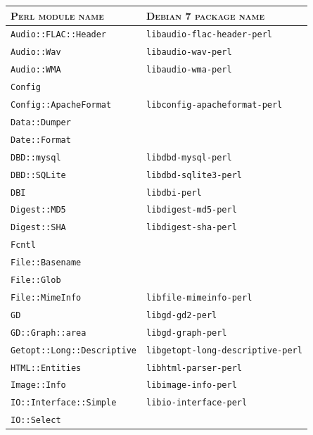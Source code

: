 \documentclass[a4paper,oneside,10pt]{report}
\begin{document}
\begin{table}
	\centering
	\begin{tabular}{|p{15em}|p{18em}|}
		\hline
		\textsc{Perl module name} 						& \textsc{Debian 7 package name} \\
		\hline
		\hline
		\verb|Audio::FLAC::Header| 						& \verb|libaudio-flac-header-perl| \\
		\hline
		\verb|Audio::Wav| 										& \verb|libaudio-wav-perl| \\
		\hline
		\verb|Audio::WMA| 										& \verb|libaudio-wma-perl| \\
		\hline
		\verb|Config| 												& \\
		\hline
		\verb|Config::ApacheFormat|						& \verb|libconfig-apacheformat-perl| \\
		\hline
		\verb|Data::Dumper| 									& \\
		\hline
		\verb|Date::Format| 									& \\
		\hline
		\verb|DBD::mysql|											& \verb|libdbd-mysql-perl| \\
		\hline
		\verb|DBD::SQLite|										& \verb|libdbd-sqlite3-perl| \\
		\hline
		\verb|DBI|														& \verb|libdbi-perl| \\
		\hline
		\verb|Digest::MD5| 										& \verb|libdigest-md5-perl| \\
		\hline
		\verb|Digest::SHA| 										& \verb|libdigest-sha-perl| \\
		\hline
		\verb|Fcntl| 													& \\
		\hline
		\verb|File::Basename| 								& \\
		\hline
		\verb|File::Glob| 										& \\
		\hline
		\verb|File::MimeInfo| 								& \verb|libfile-mimeinfo-perl| \\
		\hline
		\verb|GD| 														& \verb|libgd-gd2-perl| \\
		\hline
		\verb|GD::Graph::area| 								& \verb|libgd-graph-perl| \\
		\hline
		\verb|Getopt::Long::Descriptive| 			& \verb|libgetopt-long-descriptive-perl| \\
		\hline
		\verb|HTML::Entities|									& \verb|libhtml-parser-perl| \\
		\hline
		\verb|Image::Info| 										& \verb|libimage-info-perl| \\
		\hline
		\verb|IO::Interface::Simple| 					& \verb|libio-interface-perl| \\
		\hline
		\verb|IO::Select| 										& \\

\end{tabular}
\end{table}
\end{document}
